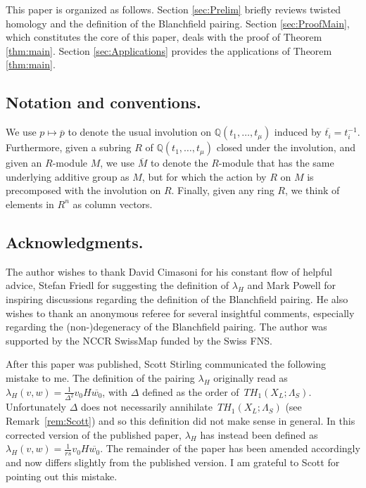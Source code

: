 \documentclass[11pt,a4paper]{amsart}
\theoremstyle{definition}
\begin{document}
\medbreak
This paper is organized as follows. Section \ref{sec:Prelim} briefly reviews twisted homology and the definition of the Blanchfield pairing. Section \ref{sec:ProofMain}, which constitutes the core of this paper, deals with the proof of Theorem \ref{thm:main}. Section \ref{sec:Applications} provides the applications of Theorem \ref{thm:main}.

\subsection*{Notation and conventions.}
We use  $p\mapsto \overline{p}$ to denote the usual involution on $\mathbb{Q}(t_1,\dots,t_\mu)$ induced by $\overline{t_i}=t_i^{-1}$. Furthermore, given a subring $R$ of $\mathbb{Q}(t_1,\dots,t_\mu)$ closed under the involution, and given an $R$-module $M$, we use $\overline{M}$ to denote the $R$-module that has the same underlying additive group as $M$, but for which the action by $R$ on $M$ is precomposed with the involution on $R$. Finally, given any ring $R$,  we think of elements in $R^n$ as column vectors.


\subsection*{Acknowledgments.} 

The author wishes to thank David Cimasoni for his constant flow of helpful advice, Stefan Friedl for suggesting the definition of $\lambda_H$ and Mark Powell for inspiring discussions regarding the definition of the Blanchfield pairing. He also wishes to thank an anonymous referee for several insightful comments, especially regarding the (non-)degeneracy of the Blanchfield pairing. 
The author was supported by the NCCR SwissMap funded by the Swiss FNS.

After this paper was published, Scott Stirling communicated the following mistake to me.
The definition of the pairing $\lambda_H$ originally read as $\lambda_H(v,w)=\frac{1}{\Delta^2}v_0H\overline{w_0}$, with $\Delta$ defined as the order of~$TH_1(X_L;\Lambda_S)$.
Unfortunately $\Delta$ does not necessarily annihilate~$TH_1(X_L;\Lambda_S)$ (see Remark~\ref{rem:Scott}) and so this definition did not make sense in general.
In this corrected version of the published paper, $\lambda_H$ has instead been defined as $\lambda_H(v,w)=\frac{1}{r\overline{s}}v_0H\overline{w_0}$.
The remainder of the paper has been amended accordingly and now differs slightly from the published version.
I am grateful to Scott for pointing out this mistake.
\end{document}
